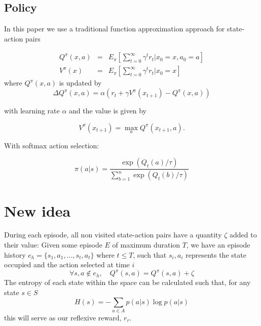 \documentclass{article}
\begin{document}
\subsection{Policy}

In this paper we use a traditional function approximation approach for state-action pairs

\begin{eqnarray} 
Q^{\pi}(x,a)&=&E_{\pi}\left[ \sum_{t=0}^\infty\gamma^{t} r_t| x_0 = x, a_0 = a \right] \\
V^{\pi}(x)&=&E_{\pi}\left[ \sum_{t=0}^\infty\gamma^{t} r_t | x_0 = x \right]
\end{eqnarray}
\noindent where $Q^{\pi}(x,a)$ is updated by~\cite{sutton1999reinforcement}
\begin{equation} \label{faeqn}
\Delta Q^{\pi}(x,a) = \alpha \left(r_t + \gamma V^{\pi}(x_{t+1}) -  Q^{\pi}(x,a) \right)
\end{equation}

\noindent with learning rate $\alpha$ and the value is given by

\begin{equation}
	V^{\pi}(x_{t+1})=\max_a Q^{\pi}(x_{t+1},a).
\end{equation}

\noindent With softmax action selection:

\begin{equation}
	\pi(a|s) = \frac{\exp(Q_t(a)/\tau)}{\sum_{b=1}^{n} \exp(Q_t(b)/\tau)}
\end{equation}

\section{New idea}

During each episode, all non visited state-action pairs have a quantity $\zeta$ added to their value:
Given some episode $E$ of maximum duration $T$, we have an episode history $e_h = \{s_1, a_1, ..., s_t, a_t\}$ where $t \leq T$, such that $s_i, a_i$ represents the state occupied and the action selected at time $i$
\begin{equation}
 \forall s, a \not\in e_h, \quad Q^\pi (s,a) = Q^\pi (s,a) + \zeta
\end{equation}
The entropy of each state within the space can be calculated such that, for any state $s \in S$
\begin{equation}
H(s) = - \sum_{a \in A} p(a|s) \log p(a|s)
\end{equation}
this will serve as our reflexive reward, $r_r$.
\end{document}
